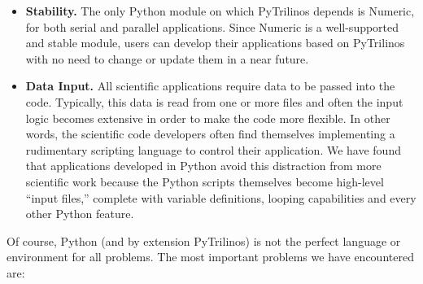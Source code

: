 \documentclass[acmtocl]{acmtrans2m}
\begin{document}
\begin{itemize}
\item {\bf Stability.} The only Python module on which PyTrilinos
  depends is Numeric, for both serial and parallel applications. Since
  Numeric is a well-supported and stable module, users can develop
  their applications based on PyTrilinos with no need to change or
  update them in a near future.

\item {\bf Data Input.} All scientific applications require data to be
  passed into the code.  Typically, this data is read from one or more
  files and often the input logic becomes extensive in order to make
  the code more flexible.  In other words, the scientific code
  developers often find themselves implementing a rudimentary
  scripting language to control their application.  We have found that
  applications developed in Python avoid this distraction from more
  scientific work because the Python scripts themselves become
  high-level ``input files,'' complete with variable definitions,
  looping capabilities and every other Python feature.

\end{itemize}

\smallskip

Of course, Python (and by extension PyTrilinos) is not the perfect
language or environment for all problems. The most important problems
we have encountered are:
\end{document}

